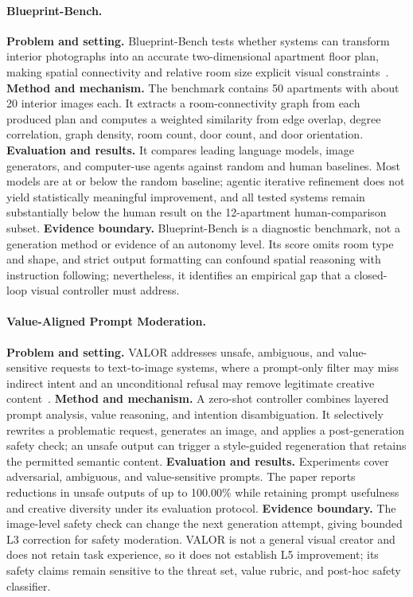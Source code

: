 \paragraph{Blueprint-Bench.}
\textbf{Problem and setting.} Blueprint-Bench tests whether systems can transform interior photographs into an accurate two-dimensional apartment floor plan, making spatial connectivity and relative room size explicit visual constraints~\cite{avg250925229}. \textbf{Method and mechanism.} The benchmark contains 50 apartments with about 20 interior images each. It extracts a room-connectivity graph from each produced plan and computes a weighted similarity from edge overlap, degree correlation, graph density, room count, door count, and door orientation. \textbf{Evaluation and results.} It compares leading language models, image generators, and computer-use agents against random and human baselines. Most models are at or below the random baseline; agentic iterative refinement does not yield statistically meaningful improvement, and all tested systems remain substantially below the human result on the 12-apartment human-comparison subset. \textbf{Evidence boundary.} Blueprint-Bench is a diagnostic benchmark, not a generation method or evidence of an autonomy level. Its score omits room type and shape, and strict output formatting can confound spatial reasoning with instruction following; nevertheless, it identifies an empirical gap that a closed-loop visual controller must address.

\paragraph{Value-Aligned Prompt Moderation.}
\textbf{Problem and setting.} VALOR addresses unsafe, ambiguous, and value-sensitive requests to text-to-image systems, where a prompt-only filter may miss indirect intent and an unconditional refusal may remove legitimate creative content~\cite{avg251111693}. \textbf{Method and mechanism.} A zero-shot controller combines layered prompt analysis, value reasoning, and intention disambiguation. It selectively rewrites a problematic request, generates an image, and applies a post-generation safety check; an unsafe output can trigger a style-guided regeneration that retains the permitted semantic content. \textbf{Evaluation and results.} Experiments cover adversarial, ambiguous, and value-sensitive prompts. The paper reports reductions in unsafe outputs of up to 100.00\% while retaining prompt usefulness and creative diversity under its evaluation protocol. \textbf{Evidence boundary.} The image-level safety check can change the next generation attempt, giving bounded L3 correction for safety moderation. VALOR is not a general visual creator and does not retain task experience, so it does not establish L5 improvement; its safety claims remain sensitive to the threat set, value rubric, and post-hoc safety classifier.


